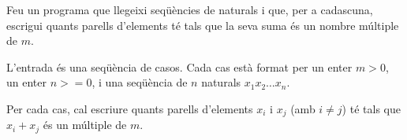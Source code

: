 

\Statement

Feu un programa que llegeixi seqüències de naturals i que, per a cadascuna, escrigui quants parells d'elements té tals que la seva suma és un nombre múltiple de $m$.


\Input

L'entrada és una seqüència de casos. Cada cas està format per un enter $m > 0$, un enter $n >= 0$, i una seqüència de $n$ naturals $x_1 x_2 \ldots x_n$.

\Output

Per cada cas, cal escriure quants parells d'elements $x_i$ i $x_j$ (amb $i \not= j$) té tals que $x_i + x_j$ és un múltiple de $m$.

\Sample


